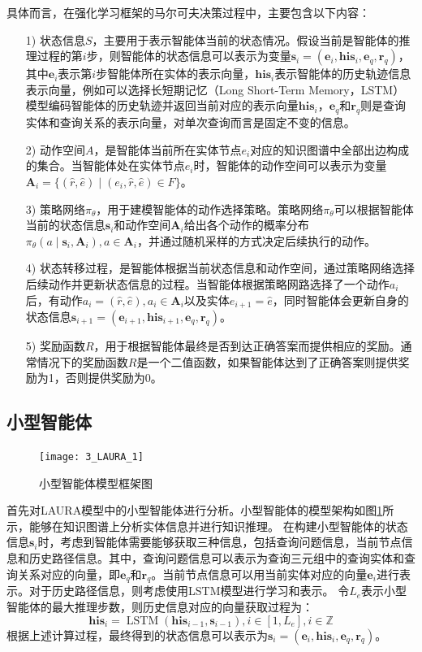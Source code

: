 \documentclass[algorithmlist, AutoFakeBold, AutoFakeSlant, figurelist, tablelist, nomlist, engineering, openany]{seuthesix} %
\begin{document}
具体而言，在强化学习框架的马尔可夫决策过程中，主要包含以下内容：
\begin{itemize}
  \item [1)] 状态信息$S$，主要用于表示智能体当前的状态情况。假设当前是智能体的推理过程的第$i$步，则智能体的状态信息可以表示为变量$\bm{s}_i = (\bm{e}_i, \bm{his}_i, \bm{e}_q, \bm{r}_q)$，其中$\bm{e}_i$表示第$i$步智能体所在实体的表示向量，$\bm{his}_i$表示智能体的历史轨迹信息表示向量，例如可以选择长短期记忆（Long Short-Term Memory，LSTM）模型编码智能体的历史轨迹并返回当前对应的表示向量$\bm{his}_i$，$\bm{e}_q$和$\bm{r}_q$则是查询实体和查询关系的表示向量，对单次查询而言是固定不变的信息。
  \item [2)] 动作空间$A$，是智能体当前所在实体节点$e_i$对应的知识图谱中全部出边构成的集合。当智能体处在实体节点$e_i$时，智能体的动作空间可以表示为变量$\bm{A}_i = \{(\hat{r}, \hat{e}) \mid (e_i, \hat{r}, \hat{e}) \in F\}$。
  \item [3)] 策略网络$\pi_\theta$，用于建模智能体的动作选择策略。策略网络$\pi_\theta$可以根据智能体当前的状态信息$\bm{s}_i$和动作空间$\bm{A}_i$给出各个动作的概率分布$\pi_\theta(a \mid \bm{s}_i, \bm{A}_i), a \in \bm{A}_i$，并通过随机采样的方式决定后续执行的动作。
  \item [4)] 状态转移过程，是智能体根据当前状态信息和动作空间，通过策略网络选择后续动作并更新状态信息的过程。当智能体根据策略网路选择了一个动作$a_i$后，有动作$a_i = (\hat{r}, \hat{e}), a_i \in \bm{A}_i$以及实体$e_{i+1}=\hat{e}$，同时智能体会更新自身的状态信息$\bm{s}_{i+1} = (\bm{e}_{i+1}, \bm{his}_{i+1}, \bm{e}_q, \bm{r}_q)$。
  \item [5)] 奖励函数$R$，用于根据智能体最终是否到达正确答案而提供相应的奖励。通常情况下的奖励函数$R$是一个二值函数，如果智能体达到了正确答案则提供奖励为1，否则提供奖励为0。
\end{itemize}

\subsection{小型智能体}
\begin{figure}
  \centering
  \texttt{[image: 3\_LAURA\_1]}
  \caption{小型智能体模型框架图}
  \label{3_LAURA_1}
\end{figure}
首先对LAURA模型中的小型智能体进行分析。小型智能体的模型架构如图\ref{3_LAURA_1}所示，能够在知识图谱上分析实体信息并进行知识推理。
在构建小型智能体的状态信息$\bm{s}_i$时，考虑到智能体需要能够获取三种信息，包括查询问题信息，当前节点信息和历史路径信息。其中，查询问题信息可以表示为查询三元组中的查询实体和查询关系对应的向量，即$\bm{e}_q$和$\bm{r}_q$。当前节点信息可以用当前实体对应的向量$\bm{e}_i$进行表示。对于历史路径信息，则考虑使用LSTM模型进行学习和表示。
令$L_e$表示小型智能体的最大推理步数，则历史信息对应的向量获取过程为：
\begin{equation}
  \bm{his}_i=\operatorname{LSTM}\left(\bm{his}_{i - 1}, \bm{s}_{i - 1}\right), i \in [1, L_e], i \in \mathbb{Z}
  \label{equation_HistoryLSTM}
\end{equation}
根据上述计算过程，最终得到的状态信息可以表示为$\bm{s}_i = (\bm{e}_i, \bm{his}_i, \bm{e}_q, \bm{r}_q)$。
\end{document}
